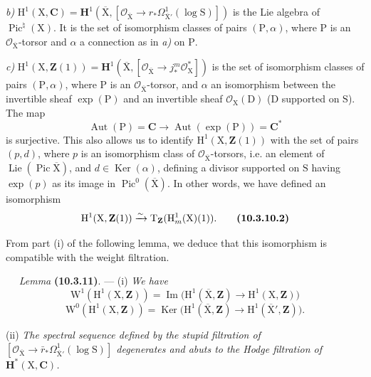 \documentclass[11pt,leqno]{article}
\newcommand{\Page}[1]{\ifvmode\noindent\else\unskip\ \fi{\footnotesize\textcolor{gray}{[p.\,#1]}}\ \ignorespaces}
\begin{document}
\textit{b)} \(\mathrm{H}^{1}(\mathrm{X},\mathbf{C})=\mathbf{H}^{1}(\overline{\mathrm{X}},[\mathcal{O}_{\overline{\mathrm{X}}}\to r_*\Omega^{1}_{\overline{\mathrm{X}}'}(\log\mathrm{S})])\) is the Lie algebra of \(\operatorname{Pic}^{\natural}(\mathrm{X})\). It is the set of isomorphism classes of pairs \((\mathrm{P},\alpha)\), where \(\mathrm{P}\) is an \(\mathcal{O}_{\overline{\mathrm{X}}}\)-torsor and \(\alpha\) a connection as in \textit{a)} on \(\mathrm{P}\).

\textit{c)} \(\mathrm{H}^{1}(\mathrm{X},\mathbf{Z}(1))=\mathbf{H}^{1}(\overline{\mathrm{X}},[\mathcal{O}_{\overline{\mathrm{X}}}\to j_*^{m}\mathcal{O}_{\mathrm{X}}^{*}])\) is the set of isomorphism classes of pairs \((\mathrm{P},\alpha)\), where \(\mathrm{P}\) is an \(\mathcal{O}_{\overline{\mathrm{X}}}\)-torsor, and \(\alpha\) an isomorphism between the invertible sheaf \(\exp(\mathrm{P})\) and an invertible sheaf \(\mathcal{O}_{\mathrm{X}}(\mathrm{D})\) (\(\mathrm{D}\) supported on \(\mathrm{S}\)). The map
\[
\operatorname{Aut}(\mathrm{P})=\mathbf{C}
\longrightarrow\operatorname{Aut}(\exp(\mathrm{P}))=\mathbf{C}^{*}
\]
is surjective. This also allows us to identify \(\mathrm{H}^{1}(\mathrm{X},\mathbf{Z}(1))\) with the set of pairs \((p,d)\), where \(p\) is an isomorphism class of \(\mathcal{O}_{\overline{\mathrm{X}}}\)-torsors, i.e. an element of \(\operatorname{Lie}(\operatorname{Pic}\overline{\mathrm{X}})\), and \(d\in\operatorname{Ker}(\alpha)\), defining a divisor supported on \(\mathrm{S}\) having \(\exp(p)\) as its image in \(\operatorname{Pic}^{0}(\overline{\mathrm{X}})\). In other words, we have defined an isomorphism
\[
\mathrm{H}^{1}(\mathrm{X},\mathbf{Z}(1))
\xrightarrow{\sim}
\mathrm{T}_{\mathbf{Z}}(\mathrm{H}^{1}_{m}(\mathrm{X})(1)).
\tag*{\textbf{(10.3.10.2)}}
\]

From part (i) of the following lemma, we deduce that this isomorphism is compatible with the weight filtration.

\Page{73}
\textit{Lemma} \textbf{(10.3.11)}. — (i) \textit{We have}
\[
\mathrm{W}^{1}(\mathrm{H}^{1}(\mathrm{X},\mathbf{Z}))
=\operatorname{Im}\bigl(
\mathrm{H}^{1}(\overline{\mathrm{X}},\mathbf{Z})
\to\mathrm{H}^{1}(\mathrm{X},\mathbf{Z})\bigr)
\]
\[
\mathrm{W}^{0}(\mathrm{H}^{1}(\mathrm{X},\mathbf{Z}))
=\operatorname{Ker}\bigl(
\mathrm{H}^{1}(\overline{\mathrm{X}},\mathbf{Z})
\to\mathrm{H}^{1}(\overline{\mathrm{X}}',\mathbf{Z})\bigr).
\]

(ii) \textit{The spectral sequence defined by the stupid filtration of
\([\mathcal{O}_{\overline{\mathrm{X}}}\to
\bar r_*\Omega^{1}_{\overline{\mathrm{X}}'}(\log\mathrm{S})]\)
degenerates and abuts to the Hodge filtration of
\(\mathbf{H}^{*}(\mathrm{X},\mathbf{C})\).}
\end{document}
